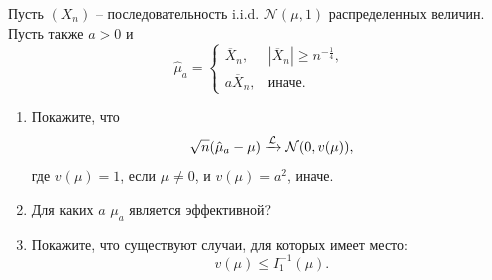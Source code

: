 \begin{exc}
	Пусть $(X_n)$ -- последовательность i.i.d. $\mathcal{N}(\mu, 1)$ распределенных величин. Пусть также $a > 0$ и
	\[ \hat{\mu}_a =
	\left \{
	\begin{array}{cl}
	\overline{X}_n, & |\overline{X}_n| \geq n^{-\frac{1}{4}}, \\
	a\overline{X}_n, & \text{иначе}. 
	\end{array}
	\right.
	\]
	\begin{enumerate}
		\item Покажите, что
		\[ \sqrt{n}(\hat{\mu}_a - \mu) \xrightarrow{\mathcal{L}} \mathcal{N}(0, v(\mu)), \]
		где $v(\mu) = 1$, если $\mu \neq 0$, и $v(\mu) = a^2$, иначе.
		\item Для каких $a$ $\mu_a$ является эффективной?
		\item Покажите, что существуют случаи, для которых имеет место:
		\[ v(\mu) \leq I_1^{-1}(\mu). \]
	\end{enumerate}
\end{exc}